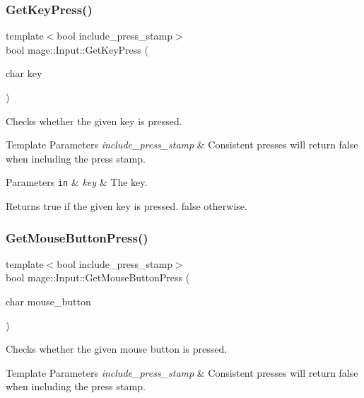 \subsubsection{\texorpdfstring{Get\+Key\+Press()}{GetKeyPress()}}
{\footnotesize\ttfamily template$<$bool include\+\_\+press\+\_\+stamp$>$ \\
bool mage\+::\+Input\+::\+Get\+Key\+Press (\begin{DoxyParamCaption}\item[{char}]{key }\end{DoxyParamCaption})}

Checks whether the given key is pressed.


\begin{DoxyTemplParams}{Template Parameters}
{\em include\+\_\+press\+\_\+stamp} & Consistent presses will return false when including the press stamp. \\
\hline
\end{DoxyTemplParams}

\begin{DoxyParams}[1]{Parameters}
\mbox{\tt in}  & {\em key} & The key. \\
\hline
\end{DoxyParams}
\begin{DoxyReturn}{Returns}
{\ttfamily true} if the given key is pressed. {\ttfamily false} otherwise. 
\end{DoxyReturn}
\hypertarget{classmage_1_1_input_a00bee37b589ac6e67293e0261ac50e9f}{}\label{classmage_1_1_input_a00bee37b589ac6e67293e0261ac50e9f} 
\subsubsection{\texorpdfstring{Get\+Mouse\+Button\+Press()}{GetMouseButtonPress()}}
{\footnotesize\ttfamily template$<$bool include\+\_\+press\+\_\+stamp$>$ \\
bool mage\+::\+Input\+::\+Get\+Mouse\+Button\+Press (\begin{DoxyParamCaption}\item[{char}]{mouse\+\_\+button }\end{DoxyParamCaption})}

Checks whether the given mouse button is pressed.


\begin{DoxyTemplParams}{Template Parameters}
{\em include\+\_\+press\+\_\+stamp} & Consistent presses will return false when including the press stamp. \\
\hline
\end{DoxyTemplParams}

